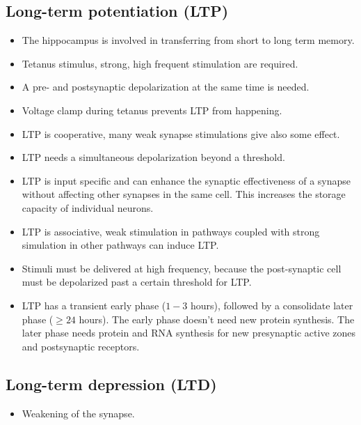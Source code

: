 \documentclass[a4paper, 12pt]{article}
\begin{document}
\subsection{Long-term potentiation (LTP)}
\begin{itemize}[noitemsep,nolistsep]
	\item The hippocampus is involved in transferring from short to long term memory.
	\item Tetanus stimulus, strong, high frequent stimulation are required.
	\item A pre- and postsynaptic depolarization at the same time is needed.
	\item Voltage clamp during tetanus prevents LTP from happening.
	\item LTP is cooperative, many weak synapse stimulations give also some effect.
	\item LTP needs a simultaneous depolarization beyond a threshold.
	\item LTP is input specific and can enhance the synaptic effectiveness of a synapse without affecting other synapses in the same cell. This increases the storage capacity of individual neurons.
	\item LTP is associative, weak stimulation in pathways coupled with strong simulation in other pathways can induce LTP.
	\item Stimuli must be delivered at high frequency, because the post-synaptic cell must be depolarized past a certain threshold for LTP.
	\item LTP has a transient early phase ($1-3$ hours), followed by a consolidate later phase ($\geq 24$ hours). The early phase doesn't need new protein synthesis. The later phase needs protein and RNA synthesis for new presynaptic active zones and postsynaptic receptors.
\end{itemize}

\subsection{Long-term depression (LTD)}
\begin{itemize}[noitemsep,nolistsep]
	\item Weakening of the synapse.
\end{itemize}
\end{document}
